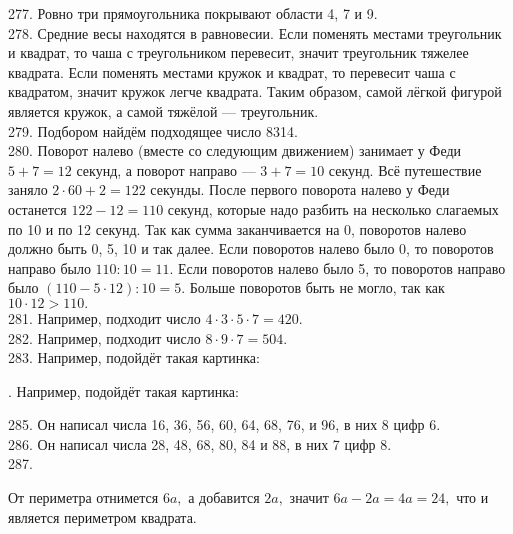 277. Ровно три прямоугольника покрывают области 4, 7 и 9.\\
278. Средние весы находятся в равновесии. Если поменять местами треугольник и квадрат, то чаша с треугольником перевесит, значит треугольник тяжелее квадрата. Если поменять местами кружок и квадрат, то перевесит чаша с квадратом, значит кружок легче квадрата. Таким образом, самой лёгкой фигурой является кружок, а самой тяжёлой --- треугольник.\\
279. Подбором найдём подходящее число 8314.\\
280. Поворот налево (вместе со следующим движением) занимает у Феди $5+7=12$ секунд, а поворот направо --- $3+7=10$ секунд. Всё путешествие заняло $2\cdot60+2=122$ секунды. После первого поворота налево у Феди останется $122-12=110$ секунд, которые надо разбить на несколько слагаемых по 10 и по 12 секунд. Так как сумма заканчивается на 0, поворотов налево должно быть 0, 5, 10 и так далее. Если поворотов налево было 0, то поворотов направо было $110:10=11.$ Если поворотов налево было 5, то поворотов направо было $(110-5\cdot12):10=5.$ Больше поворотов быть не могло, так как $10\cdot12>110.$\\
281. Например, подходит число $4\cdot3\cdot5\cdot7=420.$\\
282. Например, подходит число $8\cdot9\cdot7=504.$\\
283. Например, подойдёт такая картинка:
\begin{center}
\begin{figure}[ht!]
\end{figure}
\end{center}\newpage
{}. Например, подойдёт такая картинка:
\begin{center}
\begin{figure}[ht!]
\end{figure}
\end{center}
285. Он написал числа 16, 36, 56, 60, 64, 68, 76, и 96, в них 8 цифр 6.\\
286. Он написал числа 28, 48, 68, 80, 84 и 88, в них 7 цифр 8.\\
287. \begin{center}
\begin{figure}[ht!]
\end{figure}
\end{center}
От периметра отнимется $6a,$ а добавится $2a,$ значит $6a-2a=4a=24,$ что и является периметром квадрата.\\
